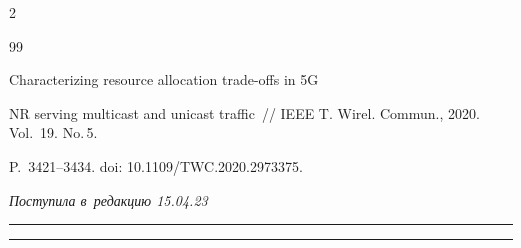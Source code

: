 \begin{multicols}{2}
{{\begin{thebibliography}{99}

 Characterizing resource allocation trade-offs in 5G 

NR serving multicast and unicast traffic~// IEEE T. Wirel. Commun., 2020. Vol.~19. No.\,5. 

P.~3421--3434. doi: 10.1109/TWC.2020.2973375.



\end{thebibliography}



 }

 }



\end{multicols}



\vspace*{-6pt}



\hfill{\small\textit{Поступила в~редакцию 15.04.23}}



\vspace*{8pt}












\hrule



\vspace*{2pt}



\hrule






\def\tit{ON MODELING THE EFFECTS OF~MULTICAST TRAFFIC SERVICING IN~5G~NR 

NETWORKS}





\def\titkol{On modeling the effects of multicast traffic servicing in 5G NR 

networks}





